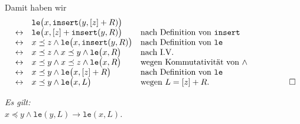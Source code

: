 \begin{enumerate}
            \\[0.1cm]
            Damit haben wir
            $$ 
            \begin{array}[b]{cll}
                            & \mathtt{le}\bigl(x, \mathtt{insert}(y, [z] + R)\bigr) \\
            \leftrightarrow & \mathtt{le}\bigl(x, [z] + \mathtt{insert}(y,R) \bigr)                & \mbox{nach Definition von \texttt{insert}}\\
            \leftrightarrow & x \preceq z \wedge \mathtt{le}\bigl( x, \mathtt{insert}(y,R) \bigr)  & \mbox{nach Definition von \texttt{le}}\\
            \leftrightarrow & x \preceq z \wedge x \preceq y \wedge \mathtt{le}\bigl( x, R\bigr)   & \mbox{nach I.V.}\\
            \leftrightarrow & x \preceq y \wedge x \preceq z \wedge \mathtt{le}\bigl( x, R\bigr)   & \mbox{wegen Kommutativit\"at von $\wedge$}\\
            \leftrightarrow & x \preceq y \wedge \mathtt{le}\bigl( x, [z] + R\bigr)                & \mbox{nach Definition von \texttt{le}}\\
            \leftrightarrow & x \preceq y \wedge \mathtt{le}\bigl( x, L\bigr)                      & \mbox{wegen $L = [z] + R$}.\\
            \end{array}\hspace*{1.6cm} \Box
            $$
\end{enumerate}

\begin{Lemma} \label{lemma:le-trans}
{\em
  Es gilt: \\[0.1cm]
  \hspace*{1.3cm} $x \preceq y \wedge \mathtt{le}(y,L) \rightarrow \mathtt{le}(x,L)$.
}  
\end{Lemma}

